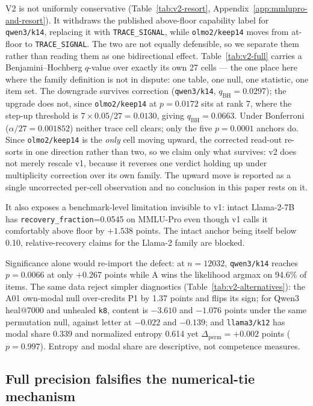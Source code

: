 V2 is not uniformly conservative (Table~\ref{tab:v2-resort}, Appendix~\ref{app:mmlupro-and-resort}). It withdraws the published above-floor capability label for \texttt{qwen3/k14}, replacing it with \texttt{TRACE\_SIGNAL}, while \texttt{olmo2/keep14} moves from at-floor to \texttt{TRACE\_SIGNAL}. The two are not equally defensible, so we separate them rather than reading them as one bidirectional effect. Table~\ref{tab:v2-full} carries a Benjamini--Hochberg $q$-value over exactly its own 27 cells --- the one place here where the family definition is not in dispute: one table, one null, one statistic, one item set. The downgrade survives correction (\texttt{qwen3/k14}, $q_{\mathrm{BH}}=0.0297$); the upgrade does not, since \texttt{olmo2/keep14} at $p=0.0172$ sits at rank 7, where the step-up threshold is $7\times0.05/27=0.0130$, giving $q_{\mathrm{BH}}=0.0663$. Under Bonferroni ($\alpha/27=0.001852$) neither trace cell clears; only the five $p=0.0001$ anchors do. Since \texttt{olmo2/keep14} is the \emph{only} cell moving upward, the corrected read-out re-sorts in one direction rather than two, so we claim only what survives: v2 does not merely rescale v1, because it reverses one verdict holding up under multiplicity correction over its own family. The upward move is reported as a single uncorrected per-cell observation and no conclusion in this paper rests on it.

It also exposes a benchmark-level limitation invisible to v1: intact Llama-2-7B has \texttt{recovery\_fraction}=0.0545 on MMLU-Pro even though v1 calls it comfortably above floor by $+1.538$ points. The intact anchor being itself below 0.10, relative-recovery claims for the Llama-2 family are blocked.

Significance alone would re-import the defect: at $n=12032$, \texttt{qwen3/k14} reaches $p=0.0066$ at only $+0.267$ points while A wins the likelihood argmax on 94.6\% of items. The same data reject simpler diagnostics
(Table~\ref{tab:v2-alternatives}):
the A01 own-modal null over-credits P1 by 1.37 points and flips its sign; for Qwen3 heal@7000 and unhealed \texttt{k8}, content is $-3.610$ and $-1.076$ points under the same permutation null, against letter at $-0.022$ and $-0.139$; and \texttt{llama3/k12} has modal share 0.339 and normalized entropy 0.614 yet $\Delta_{\mathrm{perm}}=+0.002$ points ($p=0.997$). Entropy and modal share are descriptive, not competence measures.

\subsection{Full precision falsifies the numerical-tie mechanism}

